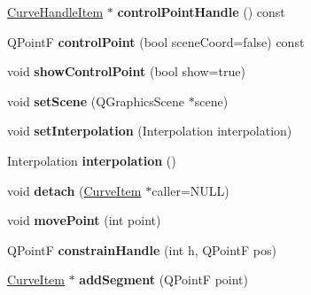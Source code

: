 \begin{DoxyCompactItemize}
\item 
\hypertarget{class_curve_item_a5afcc9d03cb7cf81ab846315375efcae}{
\hyperlink{class_curve_handle_item}{\-Curve\-Handle\-Item} $\ast$ {\bfseries control\-Point\-Handle} () const }
\label{class_curve_item_a5afcc9d03cb7cf81ab846315375efcae}

\item 
\hypertarget{class_curve_item_a4598432bda7aac82f18ac8cb572c4b61}{
\-Q\-Point\-F {\bfseries control\-Point} (bool scene\-Coord=false) const }
\label{class_curve_item_a4598432bda7aac82f18ac8cb572c4b61}

\item 
\hypertarget{class_curve_item_aeb826c22f4bc82cc45ffd50c1367ca0e}{
void {\bfseries show\-Control\-Point} (bool show=true)}
\label{class_curve_item_aeb826c22f4bc82cc45ffd50c1367ca0e}

\item 
\hypertarget{class_curve_item_a764d411125852777d3be36853e3a13ca}{
void {\bfseries set\-Scene} (\-Q\-Graphics\-Scene $\ast$scene)}
\label{class_curve_item_a764d411125852777d3be36853e3a13ca}

\item 
\hypertarget{class_curve_item_acaf33d5a5c0391d42be774b1e54ec2b0}{
void {\bfseries set\-Interpolation} (\-Interpolation interpolation)}
\label{class_curve_item_acaf33d5a5c0391d42be774b1e54ec2b0}

\item 
\hypertarget{class_curve_item_a2e5098fc089cfa4a6b0b459ca87d5dc1}{
\-Interpolation {\bfseries interpolation} ()}
\label{class_curve_item_a2e5098fc089cfa4a6b0b459ca87d5dc1}

\item 
\hypertarget{class_curve_item_aa56d8a522afbdb5e0fb5d29148ddef3c}{
void {\bfseries detach} (\hyperlink{class_curve_item}{\-Curve\-Item} $\ast$caller=\-N\-U\-L\-L)}
\label{class_curve_item_aa56d8a522afbdb5e0fb5d29148ddef3c}

\item 
\hypertarget{class_curve_item_a9cc4a042c9b3eb4ab0625187bac2efa6}{
void {\bfseries move\-Point} (int point)}
\label{class_curve_item_a9cc4a042c9b3eb4ab0625187bac2efa6}

\item 
\hypertarget{class_curve_item_a4d8cc1756881f75029a94acd13170aca}{
\-Q\-Point\-F {\bfseries constrain\-Handle} (int h, \-Q\-Point\-F pos)}
\label{class_curve_item_a4d8cc1756881f75029a94acd13170aca}

\item 
\hypertarget{class_curve_item_a20875d758d4a04ca84e4018011f6a6d8}{
\hyperlink{class_curve_item}{\-Curve\-Item} $\ast$ {\bfseries add\-Segment} (\-Q\-Point\-F point)}
\label{class_curve_item_a20875d758d4a04ca84e4018011f6a6d8}


\end{DoxyCompactItemize}

